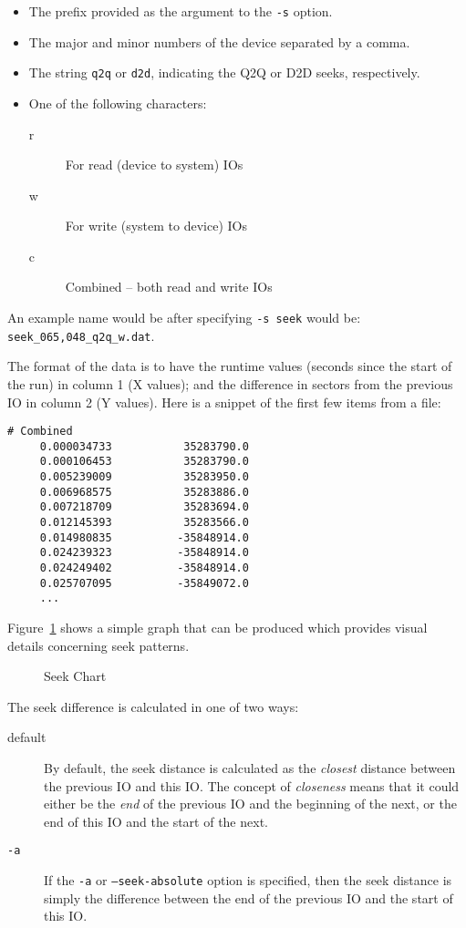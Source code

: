 \documentclass{article}
\begin{document}
  \begin{itemize}
    \item The prefix provided as the argument to the \texttt{-s} option.
    \item The major and minor numbers of the device separated by a comma.
    \item The string \texttt{q2q} or \texttt{d2d}, indicating the Q2Q or
          D2D seeks, respectively.
    \item One of the following characters:
    	\begin{description}
	  \item[r] For read (device to system) IOs
	  \item[w] For write (system to device) IOs
	  \item[c] Combined -- both read and write IOs
	\end{description}
  \end{itemize}

  An example name would be after specifying \texttt{-s seek} would be:
  \texttt{seek\_065,048\_q2q\_w.dat}.

  The format of the data is to have the runtime values (seconds since
  the start of the run) in column 1 (X values); and the difference in
  sectors from the previous IO in column 2 (Y values). Here is a snippet
  of the first few items from a file:

\begin{verbatim}
# Combined
     0.000034733           35283790.0
     0.000106453           35283790.0
     0.005239009           35283950.0
     0.006968575           35283886.0
     0.007218709           35283694.0
     0.012145393           35283566.0
     0.014980835          -35848914.0
     0.024239323          -35848914.0
     0.024249402          -35848914.0
     0.025707095          -35849072.0
     ...
\end{verbatim}

  Figure~\ref{fig:seek} shows a simple graph that can be produced which
  provides visual details concerning seek patterns.

  \begin{figure}[h!]
  \leavevmode\centering
  \caption{\label{fig:seek}Seek Chart}
  \end{figure}
  \FloatBarrier

  The seek difference is calculated in one of two ways:

  \begin{description}
    \item[default] By default, the seek distance is calculated as the
    \emph{closest} distance between the previous IO and this IO. The
    concept of \emph{closeness} means that it could either be the
    \emph{end} of the previous IO and the beginning of the next, or the
    end of this IO and the start of the next.

    \item[\texttt{-a}] If the \texttt{-a} or \texttt{--seek-absolute}
    option is specified, then the seek distance is simply the difference
    between the end of the previous IO and the start of this IO.
  \end{description}
\end{document}
